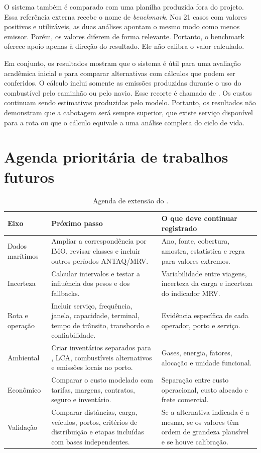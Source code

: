 O sistema também é comparado com uma planilha produzida fora do projeto. Essa referência externa recebe o nome de \emph{benchmark}. Nos 21 casos com valores positivos e utilizáveis, as duas análises apontam o mesmo modo como menos emissor. Porém, os valores diferem de forma relevante. Portanto, o benchmark oferece apoio apenas à direção do resultado. Ele não calibra o valor calculado.

Em conjunto, os resultados mostram que o sistema é útil para uma avaliação acadêmica inicial e para comparar alternativas com cálculos que podem ser conferidos. O cálculo inclui somente as emissões produzidas durante o uso do combustível pelo caminhão ou pelo navio. Esse recorte é chamado de \ttw{}. Os custos continuam sendo estimativas produzidas pelo modelo. Portanto, os resultados não demonstram que a cabotagem será sempre superior, que existe serviço disponível para a rota ou que o cálculo equivale a uma análise completa do ciclo de vida.

\section{Agenda prioritária de trabalhos futuros}
\label{sec:trabalhos-futuros}

\begin{table}[htbp]
\centering
\small
\caption{Agenda de extensão do \CabotageLens{}.}
\label{tab:agenda-futura}
\begin{tabularx}{\textwidth}{L{0.22\textwidth}Y Y}
\toprule
Eixo & Próximo passo & O que deve continuar registrado \\
\midrule
Dados marítimos & Ampliar a correspondência por IMO, revisar classes e incluir outros períodos ANTAQ/MRV. & Ano, fonte, cobertura, amostra, estatística e regra para valores extremos.\\
Incerteza & Calcular intervalos e testar a influência dos pesos e dos fallbacks. & Variabilidade entre viagens, incerteza da carga e incerteza do indicador MRV.\\
Rota e operação & Incluir serviço, frequência, janela, capacidade, terminal, tempo de trânsito, transbordo e confiabilidade. & Evidência específica de cada operador, porto e serviço.\\
Ambiental & Criar inventários separados para \wtw{}, LCA, combustíveis alternativos e emissões locais no porto. & Gases, energia, fatores, alocação e unidade funcional.\\
Econômico & Comparar o custo modelado com tarifas, margens, contratos, seguro e inventário. & Separação entre custo operacional, custo alocado e frete comercial.\\
Validação & Comparar distâncias, carga, veículos, portos, critérios de distribuição e etapas incluídas com bases independentes. & Se a alternativa indicada é a mesma, se os valores têm ordem de grandeza plausível e se houve calibração.\\
\bottomrule
\end{tabularx}
\end{table}

